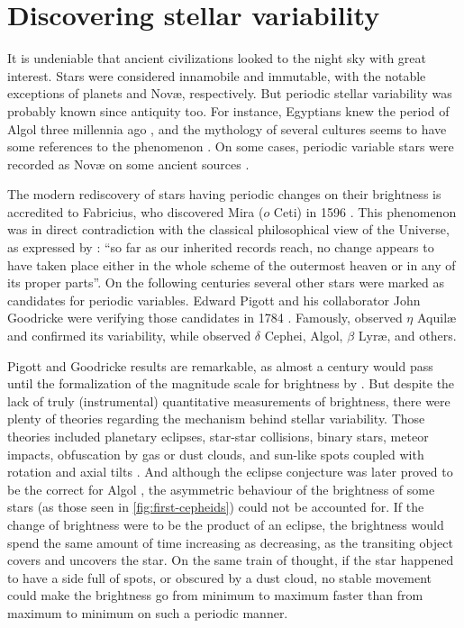\section{Discovering stellar variability \label{sec:intro-stellar-variability}}


It is undeniable that ancient civilizations looked to the night sky with great interest. 
Stars were considered innamobile and immutable, with the notable exceptions of planets and Nov\ae{}, respectively.
But periodic stellar variability was probably known since antiquity too.
For instance, Egyptians knew the period of Algol three millennia ago \citep{Jetsu2013,Jetsu2015},
and the mythology of several cultures seems to have some references to the phenomenon \citep{Wilk1996}. 
On some cases, periodic variable stars were recorded as Nov\ae{} on some ancient sources \citep{HOPENGYOKE1962}.


The modern rediscovery of stars having periodic changes on their brightness is accredited to Fabricius, 
who discovered Mira ($o$ Ceti) in 1596 \citep{Hoffleit1997}.
This phenomenon was in direct contradiction with the classical philosophical view of the Universe, as expressed by \citet[book I, part 3]{aristotle}: 
\enquote{so far as our inherited records reach, no change appears to have taken place either in the whole scheme of the outermost heaven or in any of its proper parts}.
On the following centuries several other stars were marked as candidates for periodic variables.
Edward Pigott and his collaborator John Goodricke were verifying those candidates in 1784 \citep{Hoskin1979}. 
Famously, \cite{Pigott1785} observed $\eta$ Aquil\ae{} and confirmed its variability, 
while \cite{Goodricke1786} observed $\delta$ Cephei, Algol, $\beta$ Lyr\ae{}, and others.



Pigott and Goodricke results are remarkable, as almost a century would pass until the formalization of the magnitude scale for brightness by \cite{Pogson1856}.
But despite the lack of truly (instrumental) quantitative measurements of brightness, 
there were plenty of theories regarding the mechanism behind stellar variability. 
Those theories included planetary eclipses, star-star collisions, binary stars, meteor impacts, 
obfuscation by gas or dust clouds, and sun-like spots coupled with rotation and axial tilts \citep{Hoffleit1993}. 
And although the eclipse conjecture was later proved to be the correct for Algol \citep{Pickering1880}, 
the asymmetric behaviour of the brightness of some stars (as those seen in \autoref{fig:first-cepheids}) could not be accounted for.
If the change of brightness were to be the product of an eclipse,
the brightness would spend the same amount of time increasing as decreasing,
as the transiting object covers and uncovers the star.
On the same train of thought, if the star happened to have a side full of spots, or obscured by a dust cloud,
no stable movement could make the brightness go from minimum to maximum faster than from maximum to minimum on such a periodic manner.

